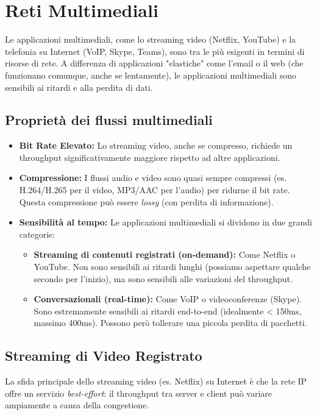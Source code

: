 \section{Reti Multimediali}
Le applicazioni multimediali, come lo streaming video (Netflix, YouTube) e la telefonia su Internet (VoIP, Skype, Teams), sono tra le più esigenti in termini di risorse di rete. A differenza di applicazioni "elastiche" come l'email o il web (che funzionano comunque, anche se lentamente), le applicazioni multimediali sono sensibili ai ritardi e alla perdita di dati.

\subsection{Proprietà dei flussi multimediali}
\begin{itemize}
    \item \textbf{Bit Rate Elevato:} Lo streaming video, anche se compresso, richiede un throughput significativamente maggiore rispetto ad altre applicazioni.
    \item \textbf{Compressione:} I flussi audio e video sono quasi sempre compressi (es. H.264/H.265 per il video, MP3/AAC per l'audio) per ridurne il bit rate. Questa compressione può essere \textit{lossy} (con perdita di informazione).
    \item \textbf{Sensibilità al tempo:} Le applicazioni multimediali si dividono in due grandi categorie:
        \begin{itemize}
            \item \textbf{Streaming di contenuti registrati (on-demand):} Come Netflix o YouTube. Non sono sensibili ai ritardi lunghi (possiamo aspettare qualche secondo per l'inizio), ma sono sensibili alle variazioni del throughput.
            \item \textbf{Conversazionali (real-time):} Come VoIP o videoconferenze (Skype). Sono estremamente sensibili ai ritardi end-to-end (idealmente < 150ms, massimo 400ms). Possono però tollerare una piccola perdita di pacchetti.
        \end{itemize}
\end{itemize}

\subsection{Streaming di Video Registrato}
La sfida principale dello streaming video (es. Netflix) su Internet è che la rete IP offre un servizio \textit{best-effort}: il throughput tra server e client può variare ampiamente a causa della congestione.

